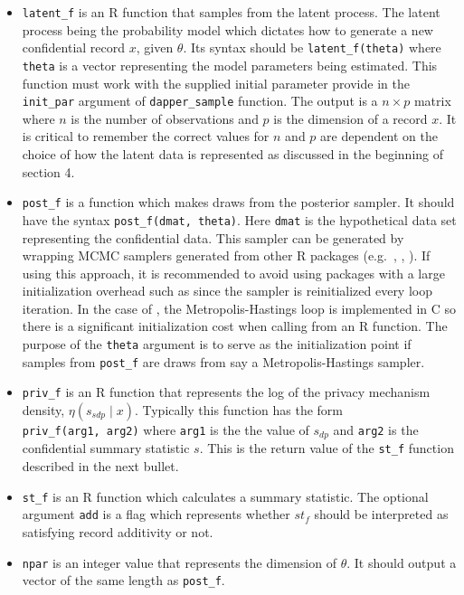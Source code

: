 \begin{itemize}
\item
  \texttt{latent\_f} is an R function that samples from the latent process.
  The latent process being the probability model which dictates how
  to generate a new confidential record \(x\), given \(\theta\).
  Its syntax should be \texttt{latent\_f(theta)} where \texttt{theta} is a vector
  representing the model parameters being estimated. This function
  must work with the supplied initial parameter provide in the \texttt{init\_par}
  argument of \texttt{dapper\_sample} function. The output is a \(n \times p\) matrix
  where \(n\) is the number of observations and \(p\) is the dimension of a record \(x\). It is
  critical to remember the correct values for \(n\) and \(p\) are dependent on the choice of how the latent data is
  represented as discussed in the beginning of section 4.
\item
  \texttt{post\_f} is a function which makes draws from the posterior sampler. It should
  have the syntax \texttt{post\_f(dmat,\ theta)}. Here \texttt{dmat} is the
  hypothetical data set representing the confidential data. This sampler can be generated by wrapping MCMC samplers generated from other R packages
  (e.g.~, , ).
  If using this approach, it is recommended to avoid using packages
  with a large initialization overhead such as  since the sampler is reinitialized
  every loop iteration. In the case of ,
  the Metropolis-Hastings loop is implemented in C so there is a significant initialization cost
  when calling from an R function. The purpose of the \texttt{theta} argument is
  to serve as the initialization point if samples from \texttt{post\_f} are draws
  from say a Metropolis-Hastings sampler.
\item
  \texttt{priv\_f} is an R function that represents the log of the privacy mechanism density, \(\eta(s_{sdp} \mid x)\).
  Typically this function has the form \texttt{priv\_f(arg1,\ arg2)} where \texttt{arg1} is the
  the value of \(s_{dp}\) and \texttt{arg2} is the confidential summary statistic \(s\).
  This is the return value of the \texttt{st\_f} function described in the next bullet.
\item
  \texttt{st\_f} is an R function which calculates a summary statistic. The optional
  argument \texttt{add} is a flag which represents whether \(st_f\) should be interpreted as
  satisfying record additivity or not.
\item
  \texttt{npar} is an integer value that represents the dimension of \(\theta\). It
  should output a vector of the same length as \texttt{post\_f}.
\end{itemize}

